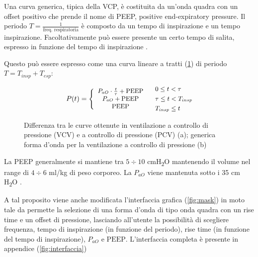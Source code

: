Una curva generica, tipica della VCP, è costituita da un'onda quadra con un offset positivo che prende il nome di PEEP, positive end-expiratory pressure. Il periodo $T=\frac{1}{\text{freq. respiratoria}}$ è composto da un tempo di inspirazione e un tempo inspirazione. Facoltativamente può essere presente un certo tempo di salita, espresso in funzione del tempo di inspirazione \cite{al-naggar_modelling_2015}. 

Questo può essere espresso come una curva lineare a tratti (\cref{fig:PCV}) di periodo $T=T_{insp}+T_{esp}$:

\begin{equation}
	\small{
	P(t)=\left\{\begin{array}{c}
		P_{aO} \cdot \frac{t}{\tau}+\mathrm{PEEP} \\
		P_{aO}+\mathrm{PEEP} \\
		\mathrm{PEEP}
	\end{array}\right.\quad \begin{aligned}
		&0 \leq t < \tau \\
		&\tau \leq t < T_{insp} \\
		&T_{insp} \leq t 
	\end{aligned}}
\end{equation}

 \begin{figure}[t!]
	\begin{subfigure}[b]{0.5\linewidth}
		\centering
		\footnotesize{
			\def\svgwidth{\linewidth}
			}
		\caption{}
	\end{subfigure}\hfill
	\begin{subfigure}[b]{0.5\linewidth}
		\centering
		\footnotesize{
			\def\svgwidth{\linewidth}
			}
		\caption{}
		\label{fig:PCV}
	\end{subfigure}
	\caption{Differenza tra le curve ottenute in ventilazione a controllo di pressione (VCV) e a controllo di pressione (PCV) (a); generica forma d'onda per la ventilazione a controllo di pressione (b)}
	\label{fig:clinical}
\end{figure}

La PEEP generalmente si mantiene tra $5\div 10$ cmH\textsubscript{2}O mantenendo il volume nel range di $4\div 6$ ml/kg di peso corporeo. La $P_{aO}$ viene mantenuta sotto i 35 cm H\textsubscript{2}O \cite{ball_modes_2015,article}.

A tal proposito viene anche modificata l'interfaccia grafica (\cref{fig:mask}) in moto tale da permette la selezione di una forma d'onda di tipo onda quadra con un rise time e un offset di pressione, lasciando all'utente la possibilità di scegliere frequenza, tempo di inspirazione (in funzione del periodo), rise time (in funzione del tempo di inspirazione), $P_{aO}$ e $\mathrm{PEEP}$. L'interfaccia completa è presente in appendice (\cref{fig:interfaccia})
 


